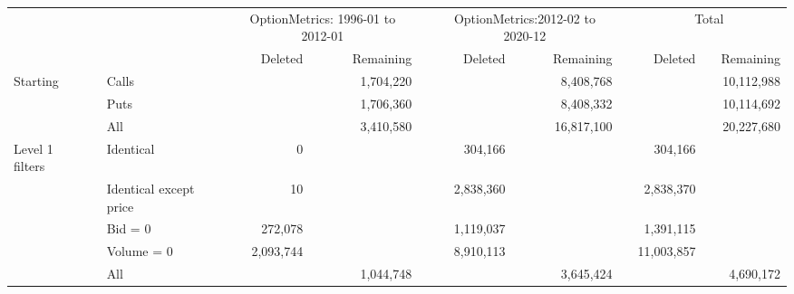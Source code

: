 

    \begin{tabular}{*{4}{l} *{11}{r} }
       
        
         \multicolumn{4}{c}{}  & \multicolumn{3}{c}{OptionMetrics: 1996-01 to 2012-01}  &  \multicolumn{1}{c}{} & 
         \multicolumn{3}{c}{OptionMetrics:2012-02 to 2020-12}&  \multicolumn{1}{c}{}  &
          \multicolumn{3}{c}{Total}  \\
         \cline{5-7}
                  
         \cline{9-11}
         \cline{13-15}
         
          &  & & & 
          Deleted &  & Remaining & &
          Deleted &  & Remaining & &
          Deleted &  & Remaining 
          \\

       \hline

	
				Starting & & Calls & &
				 & & 1,704,220 & &
				 & & 8,408,768 & &
				 & & 10,112,988 \\
			
				  & & Puts & &
				 & & 1,706,360 & &
				 & & 8,408,332 & &
				 & & 10,114,692 \\
			
				  & & All & &
				 & & 3,410,580 & &
				 & & 16,817,100 & &
				 & & 20,227,680 \\
			
				Level 1 filters & & Identical & &
				0 & &  & &
				304,166 & &  & &
				304,166 & &  \\
			
				  & & Identical except price & &
				10 & &  & &
				2,838,360 & &  & &
				2,838,370 & &  \\
			
				  & & Bid = 0 & &
				272,078 & &  & &
				1,119,037 & &  & &
				1,391,115 & &  \\
			
				  & & Volume = 0 & &
				2,093,744 & &  & &
				8,910,113 & &  & &
				11,003,857 & &  \\
			
				  & & All & &
				 & & 1,044,748 & &
				 & & 3,645,424 & &
				 & & 4,690,172 \\
			

	        \hline
	    \end{tabular}
	